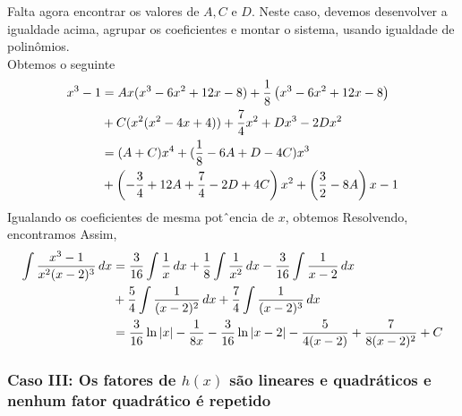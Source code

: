 \cleardoublepage\documentclass[../main.tex]{subfiles}
\begin{document}
\begin{ex}
\begin{compactenum}[a)]
\begin{sol}
Falta agora encontrar os valores de $A, C$ e $D$. Neste caso, devemos
desenvolver a igualdade acima, agrupar os coeficientes e montar o sistema,
usando igualdade de polinômios.\\
 Obtemos o seguinte
\begin{align*}
   x^3 - 1& = Ax(x^3 - 6x^2 + 12x - 8) + \frac{1}{8}\left(x^3 - 6x^2 + 12x - 8\right)\\
            & +C(x^2(x^2 - 4x + 4)) + \frac{7}{4}x^2 + Dx^3 - 2Dx^2\\
            &= (A + C)x^4 + (\frac{1}{8}- 6A + D - 4C)x^3\\
            & +\left(-\frac{3}{4}+12A+\frac{7}{4}-2D+4C\right)x^2+\left(\frac{3}{2}-8A\right)x-1
\end{align*}
Igualando os coeficientes de mesma potˆencia de $x$, obtemos
Resolvendo, encontramos
Assim,
\begin{align*}
    \int \frac{x^3-1}{x^2(x-2)^3} \, dx&=\frac{3}{16}\int \frac{1}{x} \, dx+\frac{1}{8}\int \frac{1}{x^2} \, dx-\frac{3}{16}\int \frac{1}{x-2} \, dx\\
    & +\frac{5}{4}\int \frac{1}{(x-2)^2} \, dx+\frac{7}{4}\int \frac{1}{(x-2)^3} \, dx\\
   & =\frac{3}{16}\ln|x|-\frac{1}{8x}-\frac{3}{16}\ln|x-2|-\frac{5}{4(x-2)}+\frac{7}{8(x-2)^2}+C
\end{align*}
\end{sol}
\end{compactenum}
\end{ex}


\subsubsection*{\hypertarget{FracParcCasoIII}{Caso III: Os fatores de $h(x)$ são lineares e quadráticos e nenhum fator quadrático é repetido}}
\end{document}
